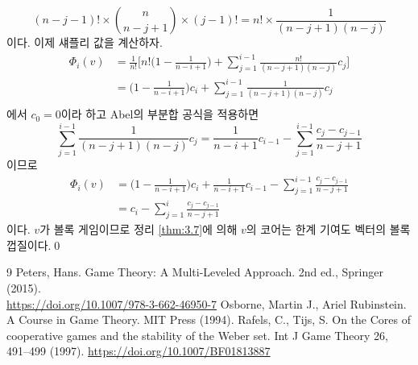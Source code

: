 \documentclass{article}
\numberwithin{equation}{section}
\begin{document}
\begin{sol}
\begin{enumerate}[(a)]
			\[
				(n-j-1)!\times\binom{n}{n-j+1}\times(j-1)!=n!\times\frac{1}{(n-j+1)(n-j)}
			\]
			이다. 이제 섀플리 값을 계산하자.
			\[
				\begin{aligned}
					\Phi_i(v)&=\frac{1}{n!}\biggl[n!\biggl(1-\frac{1}{n-i+1}\biggr)+\sum_{j=1}^{i-1}\frac{n!}{(n-j+1)(n-j)}c_j\biggr]\\
					&=\biggl(1-\frac{1}{n-i+1}\biggr)c_i+\sum_{j=1}^{i-1}\frac{1}{(n-j+1)(n-j)}c_j\\
				\end{aligned}
			\]
			에서 $c_0=0$이라 하고 Abel의 부분합 공식을 적용하면
			\[
				\sum_{j=1}^{i-1}\frac{1}{(n-j+1)(n-j)}c_j=\frac{1}{n-i+1}c_{i-1}-\sum_{j=1}^{i-1}\frac{c_j-c_{j-1}}{n-j+1}
			\]
			이므로
			\[
				\begin{aligned}
					\Phi_i(v)&=\biggl(1-\frac{1}{n-i+1}\biggr)c_i+\frac{1}{n-i+1}c_{i-1}-\sum_{j=1}^{i-1}\frac{c_j-c_{j-1}}{n-j+1}\\
					&=c_i-\sum_{j=1}^{i}\frac{c_j-c_{j-1}}{n-j+1}
				\end{aligned}
			\]
			이다. $v$가 볼록 게임이므로 정리 \ref{thm:3.7}에 의해 $v$의 코어는 한계 기여도 벡터의 볼록 껍질이다.\qed
	\end{enumerate}
\end{sol}

\begin{thebibliography}{9}
		Peters, Hans. Game Theory: A Multi-Leveled Approach. 2nd ed., Springer (2015).\\
		\url{https://doi.org/10.1007/978-3-662-46950-7}
		Osborne, Martin J., Ariel Rubinstein. A Course in Game Theory. MIT Press (1994).
		Rafels, C., Tijs, S. On the Cores of cooperative games and the stability of the Weber set. Int J Game Theory 26, 491–499 (1997). \url{https://doi.org/10.1007/BF01813887}
\end{thebibliography}
\end{document}
